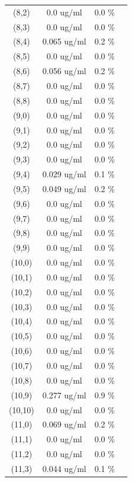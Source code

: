 \documentclass{article}
\begin{document}
\begin{tabular}{c c c c}
(8,2)&        0.0 ug/ml        &0.0 \%\\
(8,3)&        0.0 ug/ml        &0.0 \%\\
(8,4)&        0.065 ug/ml        &0.2 \%\\
(8,5)&        0.0 ug/ml        &0.0 \%\\
(8,6)&        0.056 ug/ml        &0.2 \%\\
(8,7)&        0.0 ug/ml        &0.0 \%\\
(8,8)&        0.0 ug/ml        &0.0 \%\\
(9,0)&        0.0 ug/ml        &0.0 \%\\
(9,1)&        0.0 ug/ml        &0.0 \%\\
(9,2)&        0.0 ug/ml        &0.0 \%\\
(9,3)&        0.0 ug/ml        &0.0 \%\\
(9,4)&        0.029 ug/ml        &0.1 \%\\
(9,5)&        0.049 ug/ml        &0.2 \%\\
(9,6)&        0.0 ug/ml        &0.0 \%\\
(9,7)&        0.0 ug/ml        &0.0 \%\\
(9,8)&        0.0 ug/ml        &0.0 \%\\
(9,9)&        0.0 ug/ml        &0.0 \%\\
(10,0)&        0.0 ug/ml        &0.0 \%\\
(10,1)&        0.0 ug/ml        &0.0 \%\\
(10,2)&        0.0 ug/ml        &0.0 \%\\
(10,3)&        0.0 ug/ml        &0.0 \%\\
(10,4)&        0.0 ug/ml        &0.0 \%\\
(10,5)&        0.0 ug/ml        &0.0 \%\\
(10,6)&        0.0 ug/ml        &0.0 \%\\
(10,7)&        0.0 ug/ml        &0.0 \%\\
(10,8)&        0.0 ug/ml        &0.0 \%\\
(10,9)&        0.277 ug/ml        &0.9 \%\\
(10,10)&        0.0 ug/ml        &0.0 \%\\
(11,0)&        0.069 ug/ml        &0.2 \%\\
(11,1)&        0.0 ug/ml        &0.0 \%\\
(11,2)&        0.0 ug/ml        &0.0 \%\\
(11,3)&        0.044 ug/ml        &0.1 \%\\

\end{tabular}
\end{document}
